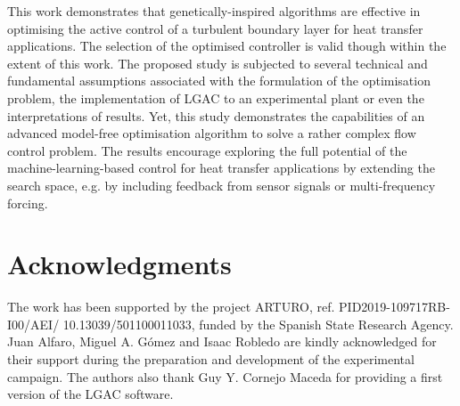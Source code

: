 This work demonstrates that genetically-inspired algorithms are effective in optimising the active control of a turbulent boundary layer for heat transfer applications. The selection of the optimised controller is valid though within the extent of this work. The proposed study is subjected to several technical and fundamental assumptions associated with the formulation of the optimisation problem, the implementation of LGAC to an experimental plant or even the interpretations of results. Yet, this study demonstrates the capabilities of an advanced model-free optimisation algorithm to solve a rather complex flow control problem. The results encourage exploring the full potential of the machine-learning-based control for heat transfer applications by extending the search space, e.g. by including feedback from sensor signals or multi-frequency forcing.

\section*{Acknowledgments}
The work has been supported by the project ARTURO, ref. PID2019-109717RB-I00/AEI/ 10.13039/501100011033, funded by the Spanish State Research Agency. \\
\noindent Juan Alfaro, Miguel A. G\'{o}mez and Isaac Robledo are kindly acknowledged for their support during the preparation and development of the experimental campaign.
The authors also thank Guy Y. Cornejo Maceda for providing a first version of the LGAC software.